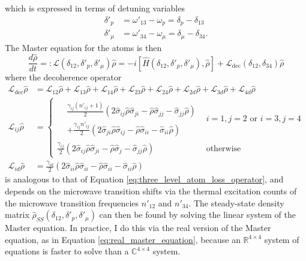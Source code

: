 which is expressed in terms of detuning variables
\begin{align}
    \delta'_p &= \omega'_{13} - \omega_p = \delta_p - \delta_{13}\\
    \delta'_\mu &= \omega'_{34} - \omega_\mu = \delta_\mu - \delta_{34}.
\end{align}
The Master equation for the atoms is then
\begin{equation}
    \frac{d\hat{\rho}}{dt} =: \mathcal{L}(\delta_{12}, \delta'_p, \delta'_\mu)\hat{\rho} = -i[\hat{H}(\delta_{12}, \delta'_p, \delta'_\mu), \hat{\rho}] + \mathcal{L}_\text{dec}(\delta_{12}, \delta_{34})\hat{\rho}
\end{equation}
where the decoherence operator
\begin{equation}
\begin{split}
    \mathcal{L}_{\text{dec}}\hat{\rho} &= \mathcal{L}_{12}\hat{\rho} + \mathcal{L}_{13}\hat{\rho} + \mathcal{L}_{14}\hat{\rho} + \mathcal{L}_{23}\hat{\rho} + \mathcal{L}_{24}\hat{\rho} + \mathcal{L}_{2d}\hat{\rho} + \mathcal{L}_{3d}\hat{\rho} + \mathcal{L}_{4d}\hat{\rho}\\
    \mathcal{L}_{ij}\hat{\rho} &=
    \begin{cases}
        \begin{split}
            &\frac{\gamma_{ij}(n'_{ij}+1)}{2} \left(2\hat{\sigma}_{ij}\hat{\rho}\hat{\sigma}_{ji} - \hat{\rho}\hat{\sigma}_{jj} - \hat{\sigma}_{jj}\hat{\rho}\right)\\
            &+ \frac{\gamma_{ij}n'_{ij}}{2} \left(2\hat{\sigma}_{ji}\hat{\rho}\hat{\sigma}_{ij} - \hat{\rho}\hat{\sigma}_{ii} - \hat{\sigma}_{ii}\hat{\rho}\right)
        \end{split}
        & \text{$i=1,j=2$ or $i=3,j=4$}\\
        \frac{\gamma_{ij}}{2} \left(2\hat{\sigma}_{ij}\hat{\rho}\hat{\sigma}_{ji} - \hat{\rho}\hat{\sigma}_{j} - \hat{\sigma}_{jj}\hat{\rho}\right) & \text{otherwise}
    \end{cases}\\
    \mathcal{L}_{id}\hat{\rho} &= \frac{\gamma_{id}}{2} \left(2\hat{\sigma}_{ii}\hat{\rho}\hat{\sigma}_{ii} - \hat{\rho}\hat{\sigma}_{ii} - \hat{\sigma}_{ii}\hat{\rho}\right)
\end{split}
\end{equation}
is analogous to that of Equation \ref{eq:three_level_atom_loss_operator}, and depends on the microwave transition shifts via the thermal excitation counts of the microwave transition frequencies $n'_{12}$ and $n'_{34}$. The steady-state density matrix $\hat{\rho}_{SS}(\delta_{12}, \delta'_p, \delta'_\mu)$ can then be found by solving the linear system of the Master equation. In practice, I do this via the real version of the Master equation, as in Equation \ref{eq:real_master_equation}, because an $\mathbb{R}^{4\times 4}$ system of equations is faster to solve than a $\mathbb{C}^{4\times 4}$ system.

